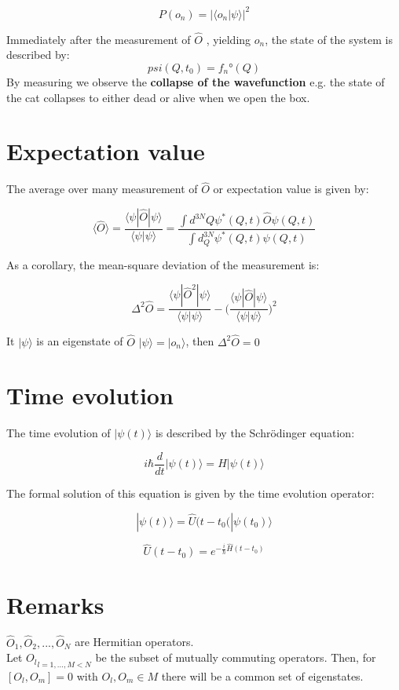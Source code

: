$$P(o_n) = |\langle o_n|\psi\rangle|^2$$

Immediately after the measurement of $\hat{O}$ , yielding $o_n$, the state of the system is described by:
$$psi(Q,t_0)=f_n°(Q)$$
By measuring we observe the \textbf{collapse of the wavefunction} e.g. the state of the cat collapses to either dead or alive when we open the box.
\section{Expectation value}
The average over many measurement of $\hat{O}$ or expectation value is given by:

$$\langle \hat{O}\rangle = \frac{\langle\psi|\hat{O}|\psi\rangle}{\langle \psi|\psi\rangle}=\frac{\int d^{3 N} Q \psi^{*}(Q, t) \hat{O} \psi(Q, t)}{\int d_{Q}^{3 N} \psi^{*}(Q, t) \psi(Q, t)}$$

As a corollary,  the mean-square deviation of the measurement is:

$$\Delta^2\hat{O} = \frac{\langle \psi|\hat{O}^2|\psi\rangle}{\langle\psi|\psi\rangle}-\biggl(\frac{\langle\psi|\hat{O}|\psi\rangle}{\langle\psi|\psi\rangle}\biggr)^2$$

It $|\psi\rangle$ is an eigenstate of $\hat{O}$ $|\psi\rangle = |o_n\rangle$, then $\Delta^2\hat{O} = 0$

\section{Time evolution}
The time evolution of $|\psi(t)\rangle$ is described by the Schr\"odinger equation:

$$i\hbar \frac{d{}}{d{t}}|\psi(t)\rangle = H|\psi(t)\rangle$$

The formal solution of this equation is given by the time evolution operator:

$$|\psi(t)\rangle = \hat{U}(t-t_0(|\psi(t_0)\rangle$$

$$\hat{U}(t-t_0) = e^{-\frac{i}{\hbar}\hat{H}(t-t_0)}$$

\section{Remarks}
$\hat{O}_1,\hat{O}_2,...,\hat{O}_N$ are Hermitian operators.\\
Let ${O_l}_{l=1,...,M<N}$ be the subset of mutually commuting operators. Then, for $[O_l,O_m]=0$ with $O_l,O_m \in M$ there will be a common set of eigenstates.\\
\noindent

